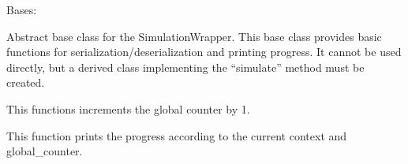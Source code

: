 \documentclass[letterpaper,10pt,english,openany,oneside]{sphinxmanual}
\begin{document}
\begin{fulllineitems}
\label{\detokenize{pygpc:pygpc.AbstractModel.AbstractModel}}
Bases: 

Abstract base class for the SimulationWrapper.
This base class provides basic functions for serialization/deserialization and printing progress.
It cannot be used directly, but a derived class implementing the “simulate” method must be created.

\begin{fulllineitems}
\label{\detokenize{pygpc:pygpc.AbstractModel.AbstractModel.get_seq_number}}
\end{fulllineitems}


\begin{fulllineitems}
\label{\detokenize{pygpc:pygpc.AbstractModel.AbstractModel.increment_ctr}}
This functions increments the global counter by 1.

\end{fulllineitems}


\begin{fulllineitems}
\label{\detokenize{pygpc:pygpc.AbstractModel.AbstractModel.print_progress}}
This function prints the progress according to the current context and global\_counter.

\end{fulllineitems}



\end{fulllineitems}
\end{document}
